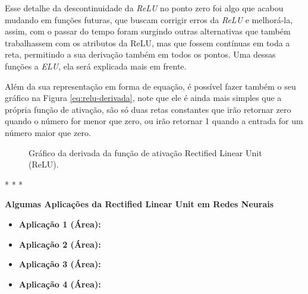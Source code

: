 Esse detalhe da descontinuidade da \textit{ReLU} no ponto zero foi algo que acabou mudando em funções futuras, que buscam corrigir erros da \textit{ReLU} e melhorá-la, assim, com o passar do tempo foram surgindo outras alternativas que também trabalhassem com os atributos da ReLU, mas que fossem contínuas em toda a reta, permitindo a sua derivação também em todos os pontos. Uma dessas funções a \textit{ELU}, ela será explicada mais em frente.

Além da sua representação em forma de equação, é possível fazer também o seu gráfico na Figura \ref{eq:relu-derivada}, note que ele é ainda mais simples que a própria função de ativação, são só duas retas constantes que irão retornar zero quando o número for menor que zero, ou irão retornar 1 quando a entrada for um número maior que zero.

\begin{figure}[h!] %
    \centering %
        \caption{Gráfico da derivada da função de ativação Rectified Linear Unit (ReLU).}
    \label{fig:relu-derivada}
\end{figure}

\medskip
\begin{center}
 * * *
\end{center}
\medskip

\textbf{Algumas Aplicações da Rectified Linear Unit em Redes Neurais}
\vspace{1em}

\begin{itemize}
    \item \textbf{Aplicação 1 (Área):}
    \item \textbf{Aplicação 2 (Área):}
    \item \textbf{Aplicação 3 (Área):}
    \item \textbf{Aplicação 4 (Área):}
\end{itemize}

